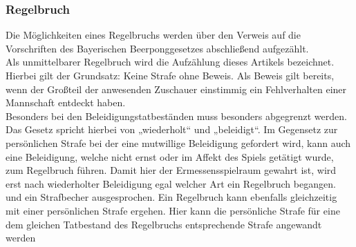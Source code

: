 \documentclass[a5paper, 12pt]{article}
\begin{document}
\subsubsection{Regelbruch}
Die Möglichkeiten eines Regelbruchs werden über den Verweis auf die Vorschriften des Bayerischen Beerponggesetzes abschließend aufgezählt.\\
Als unmittelbarer Regelbruch wird die Aufzählung dieses Artikels bezeichnet. Hierbei gilt der Grundsatz: Keine Strafe ohne Beweis. Als Beweis gilt bereits, wenn der Großteil der anwesenden Zuschauer einstimmig ein Fehlverhalten einer Mannschaft entdeckt haben.\\
Besonders bei den Beleidigungstatbeständen muss besonders abgegrenzt werden. Das Gesetz spricht hierbei von „wiederholt“ und „beleidigt“. Im Gegensetz zur persönlichen Strafe bei der eine mutwillige Beleidigung gefordert wird, kann auch eine Beleidigung, welche nicht ernst oder im Affekt des Spiels getätigt wurde, zum Regelbruch führen. Damit hier der Ermessensspielraum gewahrt ist, wird erst nach wiederholter Beleidigung egal welcher Art ein Regelbruch begangen.\\

und ein Strafbecher ausgesprochen. Ein Regelbruch kann ebenfalls gleichzeitig mit einer persönlichen Strafe ergehen. Hier kann die persönliche Strafe für eine dem gleichen Tatbestand des Regelbruchs entsprechende Strafe angewandt werden
\end{document}
